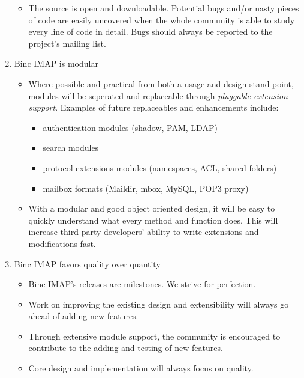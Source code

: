 \documentclass[11pt,a4paper,twoside,openright]{report}
\begin{document}
\begin{enumerate}
\begin{itemize}
  \item The source is open and downloadable. Potential bugs and/or
  nasty pieces of code are easily uncovered when the whole community
  is able to study every line of code in detail. Bugs should always be
  reported to the project's mailing list.
  \end{itemize}

\item Binc IMAP is modular
  \begin{itemize}
  \item Where possible and practical from both a usage and design
    stand point, modules will be seperated and replaceable through
    \textit{pluggable extension support}. Examples of future
    replaceables and enhancements include:
    \begin{itemize}
    \item authentication modules (shadow, PAM, LDAP)
    \item search modules
    \item protocol extensions modules (namespaces, ACL, shared folders)
    \item mailbox formats (Maildir, mbox, MySQL, POP3 proxy)
    \end{itemize}

  \item With a modular and good object oriented design, it will be
  easy to quickly understand what every method and function does. This
  will increase third party developers' ability to write extensions
  and modifications fast.

  \end{itemize}

\item Binc IMAP favors quality over quantity
  
  \begin{itemize}
  \item Binc IMAP's releases are milestones. We strive for perfection.

  \item Work on improving the existing design and extensibility will
  always go ahead of adding new features.

  \item Through extensive module support, the community is encouraged
  to contribute to the adding and testing of new features.

  \item Core design and implementation will always focus on quality.
  \end{itemize}

\end{enumerate}
\end{document}
